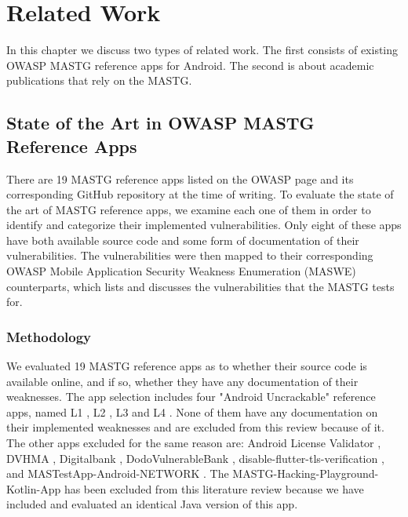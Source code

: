 \chapter{Related Work}
\label{c:related_work}

In this chapter we discuss two types of related work. The first consists of existing OWASP MASTG reference apps for Android. The second is about academic publications that rely on the MASTG.

\section{State of the Art in OWASP MASTG Reference Apps}
There are 19 MASTG reference apps listed on the OWASP page \citep{owasp_reference_app_website} and its corresponding GitHub repository \citep{mastg_repo_apps_overview} at the time of writing. To evaluate the state of the art of MASTG reference apps, we examine each one of them in order to identify and categorize their implemented vulnerabilities. Only eight of these apps have both available source code and some form of documentation of their vulnerabilities. The vulnerabilities were then mapped to their corresponding OWASP Mobile Application Security Weakness Enumeration (MASWE) counterparts, which lists and discusses the vulnerabilities that the MASTG tests for.

\subsection{Methodology}
We evaluated 19 MASTG reference apps as to whether their source code is available online, and if so, whether they have any documentation of their weaknesses. The app selection includes four "Android Uncrackable" reference apps, named L1 \citep{android_uncrackable_l1}, L2 \citep{android_uncrackable_l2}, L3 \citep{android_uncrackable_l3} and L4 \citep{android_uncrackable_l4}. None of them have any documentation on their implemented weaknesses and are excluded from this review because of it. The other apps excluded for the same reason are: Android License Validator \citep{license_validator}, DVHMA \citep{dvhma}, Digitalbank \citep{digitalbank}, DodoVulnerableBank \citep{dodo_vulnerable_bank}, disable-flutter-tls-verification \citep{disable_flutter_verification_app}, and MASTestApp-Android-NETWORK \citep{mast_test_app_android_network}. The MASTG-Hacking-Playground-Kotlin-App \citep{mastg_hacking_playground_kotlin} has been excluded from this literature review because we have included and evaluated an identical Java version of this app. 

